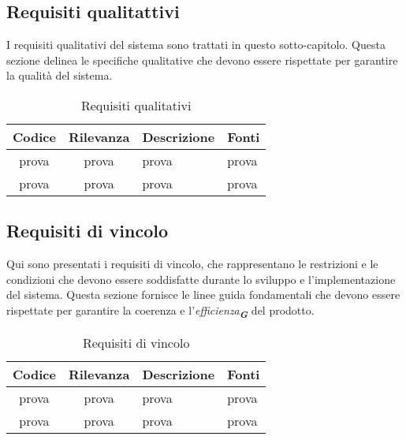     




\subsection{Requisiti qualitattivi}
I requisiti qualitativi del sistema sono trattati in questo sotto-capitolo. Questa sezione
delinea le specifiche qualitative che devono essere rispettate per garantire la qualità del
sistema.
\begin{table}[h!]
    \centering
    \renewcommand{\arraystretch}{1.6} %
    \begin{tabularx}{\textwidth}{|>{\centering\arraybackslash}c|>{\centering\arraybackslash}c|>{\centering\arraybackslash}X|>{\centering\arraybackslash}p{3cm}|} \hline
    \rowcolor[HTML]{FFD700} 
    \textbf{Codice} & \textbf{Rilevanza} & \textbf{Descrizione} & \textbf{Fonti} \\ \hline
    prova & prova & prova & prova \\ \hline
    prova & prova & prova & prova \\ \hline
    \end{tabularx}
    \caption{Requisiti qualitativi}
    \label{tab:Requisiti_qualitativi}
\end{table}







\subsection{Requisiti di vincolo}
Qui sono presentati i requisiti di vincolo, che rappresentano le restrizioni e le condizioni
che devono essere soddisfatte durante lo sviluppo e l'implementazione del sistema. Questa
sezione fornisce le linee guida fondamentali che devono essere rispettate per garantire la
coerenza e l'\emph{efficienza}\textsubscript{\textit{\textbf{G}}} del prodotto.
\begin{table}[h!]
    \centering
    \renewcommand{\arraystretch}{1.6} %
    \begin{tabularx}{\textwidth}{|>{\centering\arraybackslash}c|>{\centering\arraybackslash}c|>{\centering\arraybackslash}X|>{\centering\arraybackslash}p{3cm}|} \hline
    \rowcolor[HTML]{FFD700} 
    \textbf{Codice} & \textbf{Rilevanza} & \textbf{Descrizione} & \textbf{Fonti} \\ \hline
    prova & prova & prova & prova \\ \hline
    prova & prova & prova & prova \\ \hline
    \end{tabularx}
    \caption{Requisiti di vincolo}
    \label{tab:Requisiti_di_vincolo}
\end{table}

